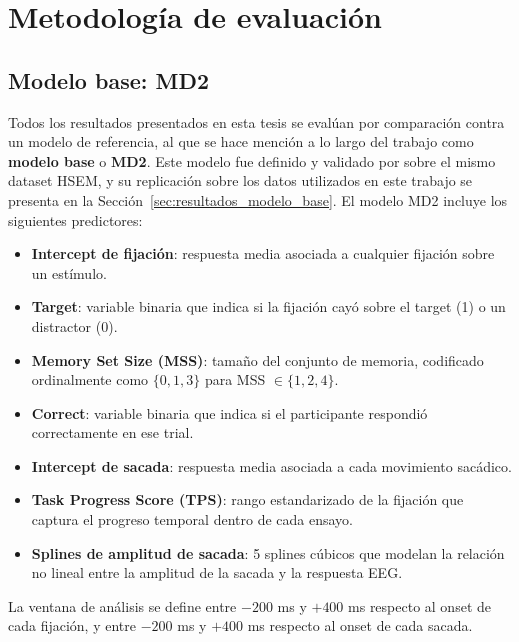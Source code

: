 \section{Metodología de evaluación}
\label{sec:evaluacion}

\subsection{Modelo base: MD2}

Todos los resultados presentados en esta tesis se evalúan por comparación contra un modelo de referencia, al que se hace mención a lo largo del trabajo como \textbf{modelo base} o \textbf{MD2}. Este modelo fue definido y validado por \citet{care2025} sobre el mismo dataset HSEM, y su replicación sobre los datos utilizados en este trabajo se presenta en la Sección~\ref{sec:resultados_modelo_base}. El modelo MD2 incluye los siguientes predictores:

\begin{itemize}
    \item \textbf{Intercept de fijación}: respuesta media asociada a cualquier
    fijación sobre un estímulo.
    \item \textbf{Target}: variable binaria que indica si la fijación cayó sobre 
    el target (1) o un distractor (0).
    \item \textbf{Memory Set Size (MSS)}: tamaño del conjunto de memoria, 
    codificado ordinalmente como $\{0, 1, 3\}$ para MSS $\in \{1, 2, 4\}$.
    \item \textbf{Correct}: variable binaria que indica si el participante 
    respondió correctamente en ese trial.
    \item \textbf{Intercept de sacada}: respuesta media asociada a cada 
    movimiento sacádico.
    \item \textbf{Task Progress Score (TPS)}: rango estandarizado de la fijación que captura el progreso temporal dentro de cada ensayo.
    \item \textbf{Splines de amplitud de sacada}: 5 splines cúbicos que 
    modelan la relación no lineal entre la amplitud de la sacada y la 
    respuesta EEG.
\end{itemize}

La ventana de análisis se define entre $-200$ ms y $+400$ ms respecto al onset 
de cada fijación, y entre $-200$ ms y $+400$ ms respecto al onset de cada sacada.


